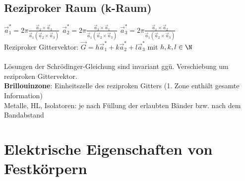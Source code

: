 \documentclass[fs, footer]{latex4ei}
\begin{document}
\begin{multicols*}{4}
\subsection{Reziproker Raum (k-Raum)}
$\vec a_1^* = 2\pi \frac{\vec a_2 \times \vec a_3}{\vec a_1(\vec a_2 \times \vec a_3)}$ \quad $\vec a_2^* = 2\pi \frac{\vec a_3 \times \vec a_1}{\vec a_1(\vec a_2 \times \vec a_3)}$ \quad $\vec a_3^* = 2\pi \frac{\vec a_1 \times \vec a_2}{\vec a_1(\vec a_2 \times \vec a_3)}$ \\
Reziproker Gittervektor: $\vec G = h\vec a_1^* + k\vec a_2^* + l\vec a_3^*$ mit $h, k, l \in \N$\\ \\
Lösungen der Schrödinger-Gleichung sind invariant ggü. Verschiebung um reziproken Gittervektor.\\
\textbf{Brillouinzone}: Einheitszelle des reziproken Gitters (1. Zone enthält gesamte Information)\\
Metalle, HL, Isolatoren: je nach Füllung der erlaubten Bänder bzw. nach dem Bandabstand

\columnbreak

\section{Elektrische Eigenschaften von Festkörpern}
\\ \\ 
	\sectionbox{
			
}
\end{multicols*}
\end{document}
